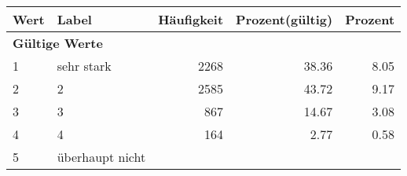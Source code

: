      \begin{longtable}{lXrrr}
     \toprule
     \textbf{Wert} & \textbf{Label} & \textbf{Häufigkeit} & \textbf{Prozent(gültig)} & \textbf{Prozent} \\
     \endhead
     \midrule
     \multicolumn{5}{l}{\textbf{Gültige Werte}}\\

     1 &
     \multicolumn{1}{X}{ sehr stark   } &


       \num{2268} &
       \num[round-mode=places,round-precision=2]{38,36} &
         \num[round-mode=places,round-precision=2]{8,05} \\

     2 &
     \multicolumn{1}{X}{ 2   } &


       \num{2585} &
       \num[round-mode=places,round-precision=2]{43,72} &
         \num[round-mode=places,round-precision=2]{9,17} \\

     3 &
     \multicolumn{1}{X}{ 3   } &


       \num{867} &
       \num[round-mode=places,round-precision=2]{14,67} &
         \num[round-mode=places,round-precision=2]{3,08} \\

     4 &
     \multicolumn{1}{X}{ 4   } &


       \num{164} &
       \num[round-mode=places,round-precision=2]{2,77} &
         \num[round-mode=places,round-precision=2]{0,58} \\

     5 &
     \multicolumn{1}{X}{ überhaupt nicht   } &



\end{longtable}
